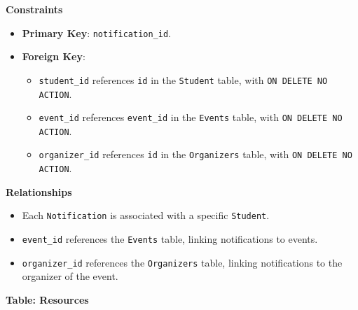 \documentclass[12pt]{article}
\begin{document}
\pagebreak

\noindent
\textbf{Constraints}
\begin{itemize}
    \item \textbf{Primary Key}: \texttt{notification\_id}.

    \item \textbf{Foreign Key}: 
    \begin{itemize}
        \item \texttt{student\_id} references \texttt{id} in the \texttt{Student} table, with \texttt{ON DELETE NO ACTION}.
        \item \texttt{event\_id} references \texttt{event\_id} in the \texttt{Events} table, with \texttt{ON DELETE NO ACTION}.
        \item \texttt{organizer\_id} references \texttt{id} in the \texttt{Organizers} table, with \texttt{ON DELETE NO ACTION}.
    \end{itemize}
\end{itemize}

\noindent
\textbf{Relationships} 
\begin{itemize}
    \item Each \texttt{Notification} is associated with a specific \texttt{Student}.
    \item \texttt{event\_id} references the \texttt{Events} table, linking notifications to events.
    \item \texttt{organizer\_id} references the \texttt{Organizers} table, linking notifications to the organizer of the event.
\end{itemize}

\pagebreak

\textbf{Table: Resources} \\
\end{document}
